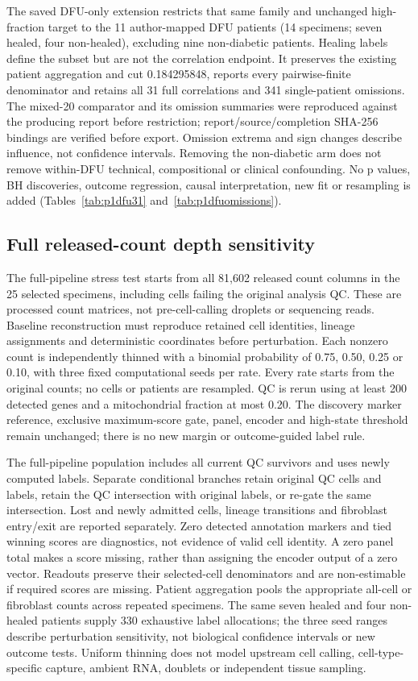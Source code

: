 The saved DFU-only extension restricts that same family and unchanged high-fraction target to the 11 author-mapped DFU patients (14 specimens; seven healed, four non-healed), excluding nine non-diabetic patients. Healing labels define the subset but are not the correlation endpoint. It preserves the existing patient aggregation and cut 0.184295848, reports every pairwise-finite denominator and retains all 31 full correlations and 341 single-patient omissions. The mixed-20 comparator and its omission summaries were reproduced against the producing report before restriction; report/source/completion SHA-256 bindings are verified before export. Omission extrema and sign changes describe influence, not confidence intervals. Removing the non-diabetic arm does not remove within-DFU technical, compositional or clinical confounding. No p values, BH discoveries, outcome regression, causal interpretation, new fit or resampling is added (Tables~\ref{tab:p1dfu31} and~\ref{tab:p1dfuomissions}).

\subsection{Full released-count depth sensitivity}
The full-pipeline stress test starts from all 81,602 released count columns in the 25 selected specimens, including cells failing the original analysis QC. These are processed count matrices, not pre-cell-calling droplets or sequencing reads. Baseline reconstruction must reproduce retained cell identities, lineage assignments and deterministic coordinates before perturbation. Each nonzero count is independently thinned with a binomial probability of 0.75, 0.50, 0.25 or 0.10, with three fixed computational seeds per rate. Every rate starts from the original counts; no cells or patients are resampled. QC is rerun using at least 200 detected genes and a mitochondrial fraction at most 0.20. The discovery marker reference, exclusive maximum-score gate, panel, encoder and high-state threshold remain unchanged; there is no new margin or outcome-guided label rule.

The full-pipeline population includes all current QC survivors and uses newly computed labels. Separate conditional branches retain original QC cells and labels, retain the QC intersection with original labels, or re-gate the same intersection. Lost and newly admitted cells, lineage transitions and fibroblast entry/exit are reported separately. Zero detected annotation markers and tied winning scores are diagnostics, not evidence of valid cell identity. A zero panel total makes a score missing, rather than assigning the encoder output of a zero vector. Readouts preserve their selected-cell denominators and are non-estimable if required scores are missing. Patient aggregation pools the appropriate all-cell or fibroblast counts across repeated specimens. The same seven healed and four non-healed patients supply 330 exhaustive label allocations; the three seed ranges describe perturbation sensitivity, not biological confidence intervals or new outcome tests. Uniform thinning does not model upstream cell calling, cell-type-specific capture, ambient RNA, doublets or independent tissue sampling.

